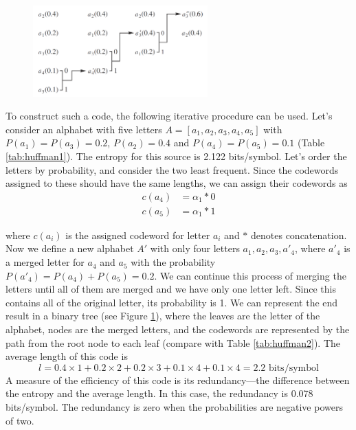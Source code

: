       \begin{figure}
        \centering
        \includegraphics[width=0.6\textwidth]{huffman}
        \label{fig:huffman}
      \end{figure}

      To construct such a code, the following iterative procedure can be used. Let's consider an alphabet with five letters $A = [a_1,a_2,a_3,a_4,a_5]$ with $P(a_1)=P(a_3)=0.2$, $P(a_2)=0.4$ and $P(a_4)=P(a_5)=0.1$ (Table \ref{tab:huffman1}). The entropy for this source is 2.122 bits/symbol. Let's order the letters by probability, and consider the two least frequent. Since the codewords assigned to these should have the same lengths, we can assign their codewords as
      \begin{align*}
        c(a_4) &= \alpha_1 * 0 \\
        c(a_5) &= \alpha_1 *1
      \end{align*}

      where $c(a_i)$ is the assigned codeword for letter $a_i$ and $*$ denotes concatenation. Now we define a new alphabet $A'$ with only four letters $a_1, a_2, a_3, a'_4$, where $a'_4$ is a merged letter for $a_4$ and $a_5$ with the probability $P(a'_4) = P(a_4) + P(a_5) = 0.2$. We can continue this process of merging the letters until all of them are merged and we have only one letter left. Since this contains all of the original letter, its probability is 1. We can represent the end result in a binary tree (see Figure \ref{fig:huffman}), where the leaves are the letter of the alphabet, nodes are the merged letters, and the codewords are represented by the path from the root node to each leaf (compare with Table \ref{tab:huffman2}). The average length of this code is
      \begin{equation}
        l = 0.4\times 1 + 0.2 \times 2 + 0.2 \times 3 + 0.1 \times 4 + 0.1 \times 4 = 2.2 \text{ bits/symbol}
      \end{equation}
      A measure of the efficiency of this code is its redundancy—the difference between the entropy
      and the average length. In this case, the redundancy is 0.078 bits/symbol. The redundancy is
      zero when the probabilities are negative powers of two.

